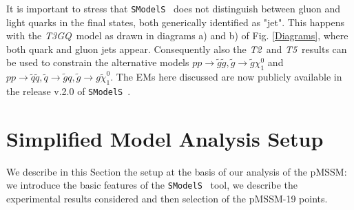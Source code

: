 \documentclass[a4paper,11pt]{article}
\newcommand{\MET}{{ $E_T ^{miss}$}}
\newcommand{\SMO}{\texttt{SModelS\xspace}}
\newcommand{\TGQ}{ \textit{T3GQ}}
\newcommand{\Ttwo}{ \textit{T2}}
\newcommand{\Tfive}{ \textit{T5}}
\begin{document}
%
%
%
It is important to stress that \SMO~ does not distinguish between gluon and light quarks in the final states, both generically identified as "jet". This happens with the \TGQ~model as drawn in diagrams a) and b) of Fig. \ref{Diagrams}, where both quark and gluon jets appear. Consequently also the \Ttwo~and\Tfive~results can be used to constrain the alternative models $p p \rightarrow \tilde g \tilde g ,\tilde g \rightarrow \tilde g \chi _1 ^0$ and $p p \rightarrow \tilde q \tilde q ,\tilde q \rightarrow \tilde g q, \tilde g \rightarrow g \tilde \chi _1 ^0$.
The EMs here discussed are now publicly available in the release v.2.0 of \SMO~.  
%
\section{Simplified Model Analysis Setup}\label{sec::setup}
%
We describe in this Section the setup at the basis of our analysis of the pMSSM: we introduce the basic features of the \SMO~ tool, we describe the experimental results considered and then selection of the pMSSM-19 points. 
\end{document}
